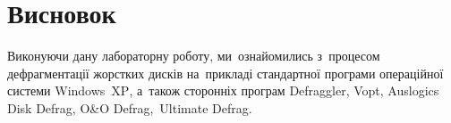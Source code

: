 \documentclass[
	a4paper,
	oneside,
	DIV = 12,
	fontsize = 13pt,
	headings = normal,
]{scrartcl}
\begin{document}
	\section{Висновок}
		Виконуючи дану лабораторну роботу, ми~ознайомились з~процесом дефрагментації жорстких дисків на~прикладі стандартної програми операційної системи \textenglish{Windows~XP}, а~також сторонніх програм \textenglish{Defraggler, Vopt, Auslogics Disk Defrag, O\&O Defrag,~Ultimate Defrag}.
\end{document}
